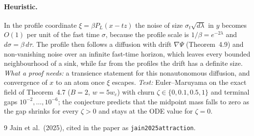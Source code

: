 \documentclass[11pt]{article}
\theoremstyle{definition}
\theoremstyle{remark}
\begin{document}
\paragraph{Heuristic.} In the profile coordinate $\xi=\beta P_L(x-tz)$ the noise of size
$\sigma_t\sqrt{d\lambda}$ in $y$ becomes $O(1)$ per unit of the fast time $\sigma$, because the profile
scale is $1/\beta=e^{-2\lambda}$ and $d\sigma=\beta\,d\tau$. The profile then follows a diffusion with drift
$\nabla\Psi$ (Theorem~4.9) and non-vanishing noise over an infinite fast-time horizon, which leaves every
bounded neighbourhood of a sink, while far from the profiles the drift has a definite size.
\emph{What a proof needs:} a transience statement for this nonautonomous diffusion, and convergence
of $x$ to an atom once $\xi$ escapes. \emph{Test:} Euler--Maruyama on the exact field of Theorem~4.7
($B=2$, $w=5w_c$) with churn $\zeta\in\{0,0.1,0.5,1\}$ and terminal gaps $10^{-2},\dots,10^{-6}$; the
conjecture predicts that the midpoint mass falls to zero as the gap shrinks for every $\zeta>0$ and
stays at the ODE value for $\zeta=0$.

\begin{thebibliography}{9}
 Jain et al.\ (2025), cited in the paper as \texttt{jain2025attraction}.
\end{thebibliography}
\end{document}

